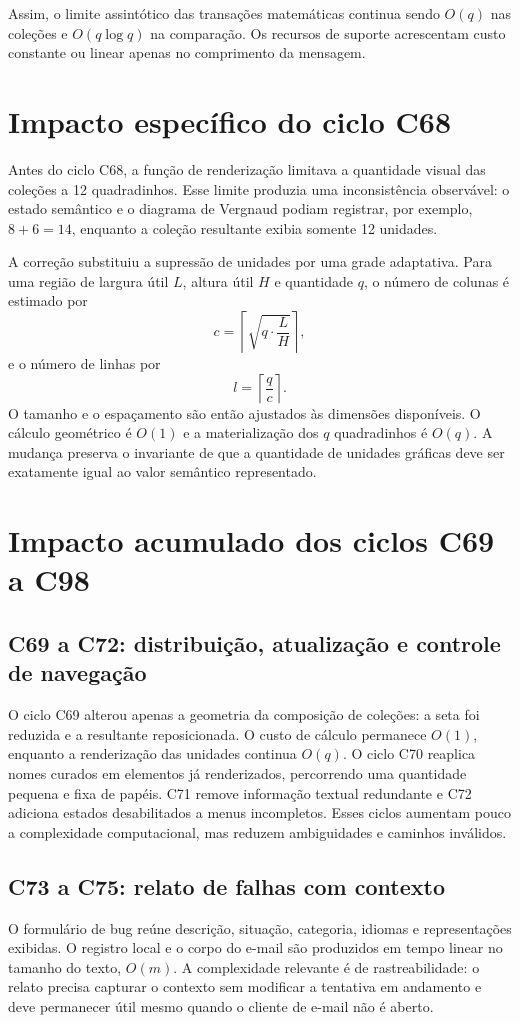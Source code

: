 \documentclass[12pt,a4paper]{article}
\begin{document}
Assim, o limite assintótico das transações matemáticas continua sendo $O(q)$ nas coleções e $O(q\log q)$ na comparação. Os recursos de suporte acrescentam custo constante ou linear apenas no comprimento da mensagem.

\section{Impacto específico do ciclo C68}

Antes do ciclo C68, a função de renderização limitava a quantidade visual das coleções a 12 quadradinhos. Esse limite produzia uma inconsistência observável: o estado semântico e o diagrama de Vergnaud podiam registrar, por exemplo, $8+6=14$, enquanto a coleção resultante exibia somente 12 unidades.

A correção substituiu a supressão de unidades por uma grade adaptativa. Para uma região de largura útil $L$, altura útil $H$ e quantidade $q$, o número de colunas é estimado por
\[
c=\left\lceil\sqrt{q\cdot\frac{L}{H}}\right\rceil,
\]
e o número de linhas por
\[
l=\left\lceil\frac{q}{c}\right\rceil.
\]
O tamanho e o espaçamento são então ajustados às dimensões disponíveis. O cálculo geométrico é $O(1)$ e a materialização dos $q$ quadradinhos é $O(q)$. A mudança preserva o invariante de que a quantidade de unidades gráficas deve ser exatamente igual ao valor semântico representado.


\section{Impacto acumulado dos ciclos C69 a C98}

\subsection{C69 a C72: distribuição, atualização e controle de navegação}
O ciclo C69 alterou apenas a geometria da composição de coleções: a seta foi reduzida e a resultante reposicionada. O custo de cálculo permanece $O(1)$, enquanto a renderização das unidades continua $O(q)$. O ciclo C70 reaplica nomes curados em elementos já renderizados, percorrendo uma quantidade pequena e fixa de papéis. C71 remove informação textual redundante e C72 adiciona estados desabilitados a menus incompletos. Esses ciclos aumentam pouco a complexidade computacional, mas reduzem ambiguidades e caminhos inválidos.

\subsection{C73 a C75: relato de falhas com contexto}
O formulário de bug reúne descrição, situação, categoria, idiomas e representações exibidas. O registro local e o corpo do e-mail são produzidos em tempo linear no tamanho do texto, $O(m)$. A complexidade relevante é de rastreabilidade: o relato precisa capturar o contexto sem modificar a tentativa em andamento e deve permanecer útil mesmo quando o cliente de e-mail não é aberto.
\end{document}
